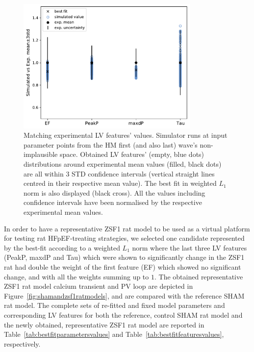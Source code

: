 \begin{figure}[!ht]
    \myfloatalign
    \includegraphics[width=0.8\textwidth]{figures/chapter07/w1_features_match.pdf}
    \caption{Matching experimental LV features' values. Simulator runs at input parameter points from the HM first (and also last) wave's non-implausible space. Obtained LV features’ (empty, blue dots) distributions around experimental mean values (filled, black dots) are all within 3 STD confidence intervals (vertical straight lines centred in their respective mean value). The best fit in weighted $L_1$ norm is also displayed (black cross). All the values including confidence intervals have been normalised by the respective experimental mean values.}
    \label{fig:w1bestzsf1model}
\end{figure}

\vspace{0.2cm}
In order to have a representative ZSF1 rat model to be used as a virtual platform for testing rat HFpEF-treating strategies, we selected one candidate represented by the best-fit according to a weighted $L_1$ norm where the last three LV features (PeakP, maxdP and Tau) which were shown to significantly change in the ZSF1 rat had double the weight of the first feature (EF) which showed no significant change, and with all the weights summing up to $1$. The obtained representative ZSF1 rat model calcium transient and PV loop are depicted in Figure~\ref{fig:shamandzsf1ratmodels}, and are compared with the reference SHAM rat model. The complete sets of re-fitted and fixed model parameters and corresponding LV features for both the reference, control SHAM rat model and the newly obtained, representative ZSF1 rat model are reported in Table~\ref{tab:bestfitparametersvalues} and Table~\ref{tab:bestfitfeaturesvalues}, respectively.

